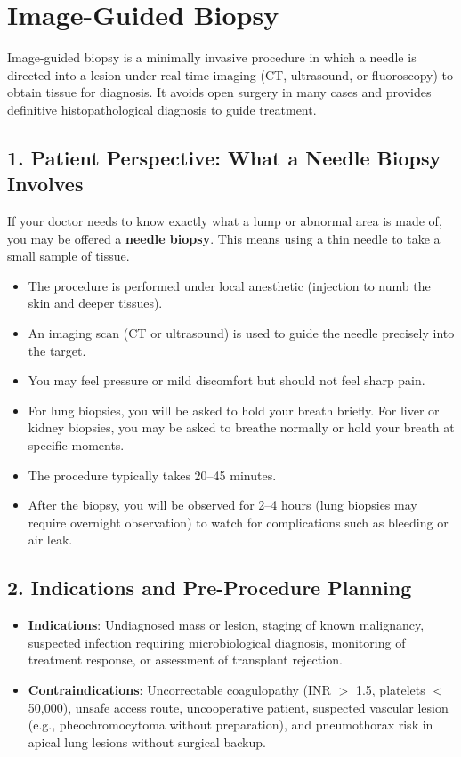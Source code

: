 \chapter{Image-Guided Biopsy}

\label{ch:ch77_biopsy}

Image-guided biopsy is a minimally invasive procedure in which a needle is directed into a lesion under real-time imaging (CT, ultrasound, or fluoroscopy) to obtain tissue for diagnosis. It avoids open surgery in many cases and provides definitive histopathological diagnosis to guide treatment.


\section{1. Patient Perspective: What a Needle Biopsy Involves}

If your doctor needs to know exactly what a lump or abnormal area is made of, you may be offered a \textbf{needle biopsy}. This means using a thin needle to take a small sample of tissue.

\begin{itemize}
  \item The procedure is performed under local anesthetic (injection to numb the skin and deeper tissues).
  \item An imaging scan (CT or ultrasound) is used to guide the needle precisely into the target.
  \item You may feel pressure or mild discomfort but should not feel sharp pain.
  \item For lung biopsies, you will be asked to hold your breath briefly. For liver or kidney biopsies, you may be asked to breathe normally or hold your breath at specific moments.
  \item The procedure typically takes 20--45 minutes.
  \item After the biopsy, you will be observed for 2--4 hours (lung biopsies may require overnight observation) to watch for complications such as bleeding or air leak.
\end{itemize}


\section{2. Indications and Pre-Procedure Planning}

\begin{itemize}
  \item \textbf{Indications}: Undiagnosed mass or lesion, staging of known malignancy, suspected infection requiring microbiological diagnosis, monitoring of treatment response, or assessment of transplant rejection.
  \item \textbf{Contraindications}: Uncorrectable coagulopathy (INR $>$ 1.5, platelets $<$ 50,000), unsafe access route, uncooperative patient, suspected vascular lesion (e.g., pheochromocytoma without preparation), and pneumothorax risk in apical lung lesions without surgical backup.
\end{itemize}

